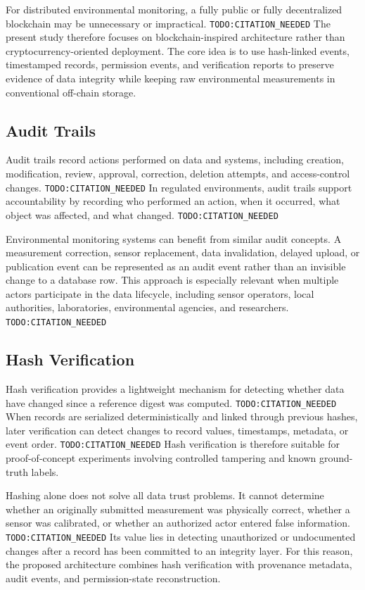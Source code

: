 For distributed environmental monitoring, a fully public or fully decentralized blockchain may be unnecessary or impractical. \texttt{TODO:CITATION\_NEEDED} The present study therefore focuses on blockchain-inspired architecture rather than cryptocurrency-oriented deployment. The core idea is to use hash-linked events, timestamped records, permission events, and verification reports to preserve evidence of data integrity while keeping raw environmental measurements in conventional off-chain storage.

\subsection{Audit Trails}

Audit trails record actions performed on data and systems, including creation, modification, review, approval, correction, deletion attempts, and access-control changes. \texttt{TODO:CITATION\_NEEDED} In regulated environments, audit trails support accountability by recording who performed an action, when it occurred, what object was affected, and what changed. \texttt{TODO:CITATION\_NEEDED}

Environmental monitoring systems can benefit from similar audit concepts. A measurement correction, sensor replacement, data invalidation, delayed upload, or publication event can be represented as an audit event rather than an invisible change to a database row. This approach is especially relevant when multiple actors participate in the data lifecycle, including sensor operators, local authorities, laboratories, environmental agencies, and researchers. \texttt{TODO:CITATION\_NEEDED}

\subsection{Hash Verification}

Hash verification provides a lightweight mechanism for detecting whether data have changed since a reference digest was computed. \texttt{TODO:CITATION\_NEEDED} When records are serialized deterministically and linked through previous hashes, later verification can detect changes to record values, timestamps, metadata, or event order. \texttt{TODO:CITATION\_NEEDED} Hash verification is therefore suitable for proof-of-concept experiments involving controlled tampering and known ground-truth labels.

Hashing alone does not solve all data trust problems. It cannot determine whether an originally submitted measurement was physically correct, whether a sensor was calibrated, or whether an authorized actor entered false information. \texttt{TODO:CITATION\_NEEDED} Its value lies in detecting unauthorized or undocumented changes after a record has been committed to an integrity layer. For this reason, the proposed architecture combines hash verification with provenance metadata, audit events, and permission-state reconstruction.

